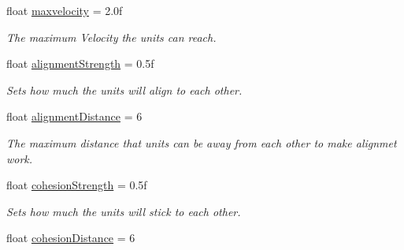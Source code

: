 \begin{DoxyCompactItemize}
\mbox{\label{class_p_s_flocking_1_1_p_s_unit_manager_a5c4bed8aa8fd71ce724c813e0903e0fb}} 
float \hyperlink{class_p_s_flocking_1_1_p_s_unit_manager_a5c4bed8aa8fd71ce724c813e0903e0fb}{maxvelocity} = 2.\+0f
\begin{DoxyCompactList}\small\item\em The maximum Velocity the units can reach. \end{DoxyCompactList}\item 
\mbox{\label{class_p_s_flocking_1_1_p_s_unit_manager_a4bced9fa2de0369f6288e5d65cb0fc4b}} 
float \hyperlink{class_p_s_flocking_1_1_p_s_unit_manager_a4bced9fa2de0369f6288e5d65cb0fc4b}{alignment\+Strength} = 0.\+5f
\begin{DoxyCompactList}\small\item\em Sets how much the units will align to each other. \end{DoxyCompactList}\item 
\mbox{\label{class_p_s_flocking_1_1_p_s_unit_manager_aa45a0fe01bcf38a17e9e9f315455a820}} 
float \hyperlink{class_p_s_flocking_1_1_p_s_unit_manager_aa45a0fe01bcf38a17e9e9f315455a820}{alignment\+Distance} = 6
\begin{DoxyCompactList}\small\item\em The maximum distance that units can be away from each other to make alignmet work. \end{DoxyCompactList}\item 
\mbox{\label{class_p_s_flocking_1_1_p_s_unit_manager_a86b7428c21b9f76a78dd13221c4ff700}} 
float \hyperlink{class_p_s_flocking_1_1_p_s_unit_manager_a86b7428c21b9f76a78dd13221c4ff700}{cohesion\+Strength} = 0.\+5f
\begin{DoxyCompactList}\small\item\em Sets how much the units will stick to each other. \end{DoxyCompactList}\item 
\mbox{\label{class_p_s_flocking_1_1_p_s_unit_manager_a9ffaea9774cccd08c81b501dd6965fac}} 
float \hyperlink{class_p_s_flocking_1_1_p_s_unit_manager_a9ffaea9774cccd08c81b501dd6965fac}{cohesion\+Distance} = 6

\end{DoxyCompactItemize}
